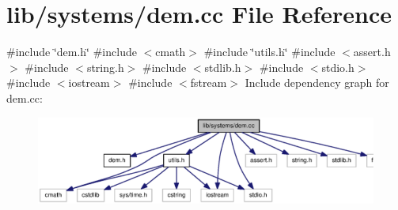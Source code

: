\section{lib/systems/dem.cc \-File \-Reference}
\label{dem_8cc}
{\ttfamily \#include \char`\"{}dem.\-h\char`\"{}}\*
{\ttfamily \#include $<$cmath$>$}\*
{\ttfamily \#include \char`\"{}utils.\-h\char`\"{}}\*
{\ttfamily \#include $<$assert.\-h$>$}\*
{\ttfamily \#include $<$string.\-h$>$}\*
{\ttfamily \#include $<$stdlib.\-h$>$}\*
{\ttfamily \#include $<$stdio.\-h$>$}\*
{\ttfamily \#include $<$iostream$>$}\*
{\ttfamily \#include $<$fstream$>$}\*
\-Include dependency graph for dem.\-cc\-:\nopagebreak
\begin{figure}[H]
\begin{center}
\leavevmode
\includegraphics[width=350pt]{dem_8cc__incl}
\end{center}
\end{figure}
